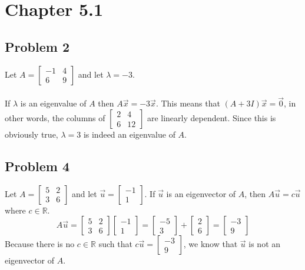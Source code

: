 \documentclass{article}%
\begin{document}
\section*{Chapter 5.1}

\subsection*{Problem 2}

Let $A =
\begin{bmatrix}
    -1 & 4 \\
    6 & 9
\end{bmatrix}$
and let $\lambda = -3$.\\
\\[0.1in]
If $\lambda$ is an eigenvalue of $A$ then $A\vec{x} = -3\vec{x}$. This means that $(A + 3I)\vec{x} = \vec{0}$, in other words, the columns of
$\begin{bmatrix}
    2 & 4 \\
    6 & 12
\end{bmatrix}$
are linearly dependent. Since this is obviously true, $\lambda = 3$ is indeed an eigenvalue of $A$.

\subsection*{Problem 4}

Let $A =
\begin{bmatrix}
    5 & 2 \\
    3 & 6
\end{bmatrix}$
and let $\vec{u} =
\begin{bmatrix}
    -1 \\ 1
\end{bmatrix}$. If $\vec{u}$ is an eigenvector of $A$, then $A\vec{u} = c\vec{u}$ where $c \in \mathbb{R}$.
\hfill
$$
A\vec{u} =
\begin{bmatrix}
    5 & 2 \\
    3 & 6
\end{bmatrix}
\begin{bmatrix}
    -1 \\ 1
\end{bmatrix}
=
\begin{bmatrix}
    -5 \\ 3
\end{bmatrix}
+
\begin{bmatrix}
    2 \\ 6
\end{bmatrix}
=
\begin{bmatrix}
    -3 \\ 9
\end{bmatrix}
$$
Because there is no $c \in \mathbb{R}$ such that $c\vec{u} = \begin{bmatrix} -3 \\ 9 \end{bmatrix}$, we know that $\vec{u}$ is not an eigenvector of $A$.
\end{document}
